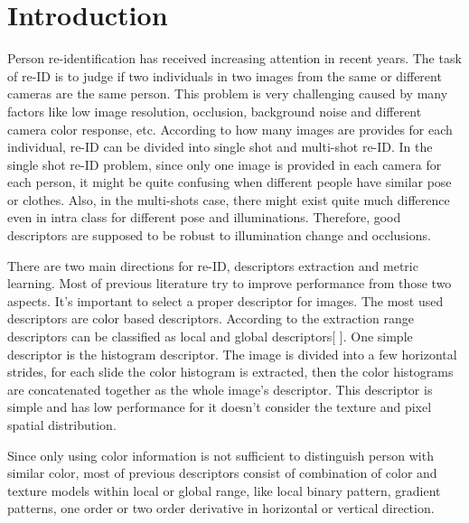 \documentclass[conference,compsoc]{IEEEtran}
\begin{document}




%
\IEEEpeerreviewmaketitle



\section{Introduction}
Person re-identification has received increasing attention in recent years. The task of re-ID is to judge if two individuals 
in two images from the same or different cameras are the same person. This problem is very challenging caused by many factors like low 
image resolution, occlusion, background noise and different camera color response, etc. According to how many images are provides for each individual, re-ID can be divided into single shot and multi-shot re-ID. In the single shot re-ID problem, since only one image is provided in each camera for each person, it might be quite confusing when different people have similar pose or clothes. Also, in the multi-shots case, there might exist quite much difference even in intra class for different pose and illuminations. Therefore, good descriptors are supposed to be robust to illumination change and occlusions.

There are two main directions for re-ID, descriptors extraction and
metric learning. Most of previous literature try to improve performance from those two aspects. 
It's important to select a proper descriptor for images. The most used descriptors are color based descriptors. According to the extraction range descriptors  
can be classified as local and global descriptors[ ].  One simple descriptor is the histogram descriptor. The image is divided into a few horizontal strides, for each slide the color histogram is extracted, then the color histograms are concatenated together as the whole image's descriptor. This descriptor is simple and has low performance for it doesn't consider the texture and pixel spatial distribution.

Since only using color information is not sufficient to distinguish person with similar color, most of previous descriptors consist of combination of color and texture models within local or global range, like local binary pattern, gradient patterns, one order or two order derivative in horizontal or vertical direction.
\end{document}
